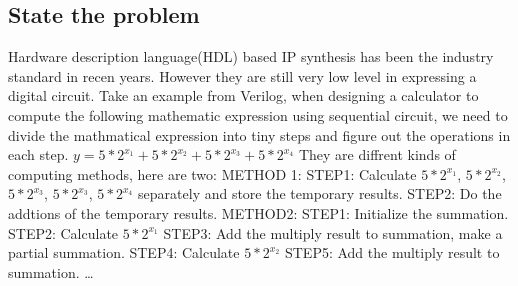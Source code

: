 \documentclass[11pt]{article} %
\begin{document}
\subsection{State the problem}
Hardware description language(HDL) based IP synthesis has been the industry standard in recen years. However they are still very low level in expressing a digital circuit. Take an example from Verilog, when designing a calculator to compute the following mathematic expression using sequential circuit, we need to divide the mathmatical expression into tiny steps and figure out the operations in each step.\newline
 \begin{math}y = 5 * 2^{x_1} + 5 * 2^{x_2} + 5 * 2^{x_3} + 5 * 2^{x_4} \end{math} \newline
They are diffrent kinds of computing methods, here are two:\newline
METHOD 1: \newline
STEP1: Calculate \begin{math}5 * 2^{x_1}\end{math}, \begin{math}5 * 2^{x_2}\end{math}, \begin{math}5 * 2^{x_3}\end{math}, \begin{math}5 * 2^{x_3}\end{math}, \begin{math}5 * 2^{x_4}\end{math} separately and store the temporary results.\newline
STEP2: Do the addtions of the temporary results.\newline \newline
METHOD2: \newline
STEP1: Initialize the summation.\newline
STEP2: Calculate \begin{math} 5 * 2^{x_1}\end{math}\newline
STEP3: Add the multiply result to summation, make a partial summation.\newline
STEP4: Calculate \begin{math} 5 * 2^{x_2}\end{math}\newline
STEP5: Add the multiply result to summation.\newline
\dots \newline 
\end{document}
